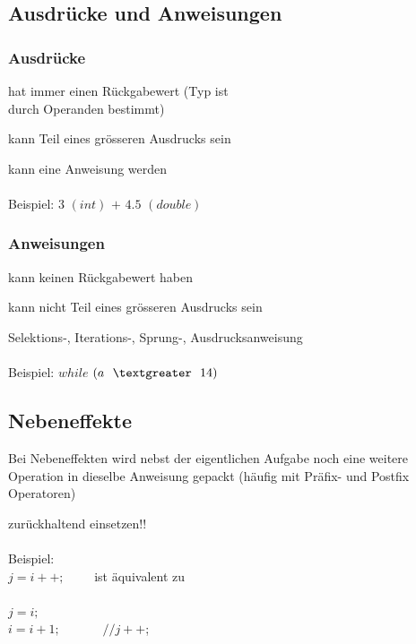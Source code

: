 		\begin{minipage}[t]{8 cm}	
			\subsection{Ausdrücke und Anweisungen }
				\subsubsection{Ausdrücke}
					\begin{compactitem}
						\item hat immer einen Rückgabewert (Typ ist\\ durch Operanden bestimmt)
						\item kann Teil eines grösseren Ausdrucks sein
						\item kann eine Anweisung werden\\\\Beispiel: $3$ $(int)$ $+$ $4.5$ $(double)$
					\end{compactitem}
				\subsubsection{Anweisungen}
					\begin{compactitem}
						\item kann keinen Rückgabewert haben
						\item kann nicht Teil eines grösseren Ausdrucks sein
						\item Selektions-, Iterations-, Sprung-, Ausdrucksanweisung\\\\
						Beispiel: $while$ $(a\ \ \textgreater\ \ 14)$
					\end{compactitem}
		\end{minipage}
		\hspace*{1cm}
		\begin{minipage}[t]{9 cm}
			\subsection{Nebeneffekte }
				\begin{compactitem}
					\item Bei Nebeneffekten wird nebst der eigentlichen Aufgabe noch eine weitere
					Operation in dieselbe Anweisung gepackt (häufig mit Präfix- und Postfix Operatoren)
					\item zurückhaltend einsetzen!!\\\\
					Beispiel:\\
					$j = i++;$
					\ \ \ \ ist äquivalent zu\\\\
					$j = i;$\\
					$i = i+1;$ \ \ \ \ \ \ $// j++$; 	
				\end{compactitem}
		\end{minipage}
